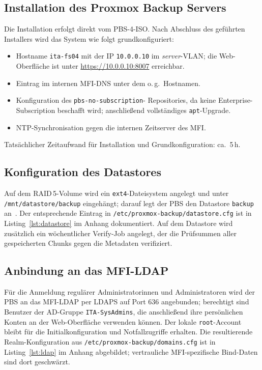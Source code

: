 \subsection{Installation des Proxmox Backup Servers}
\label{sec:InstallationPBS}
Die Installation erfolgt direkt vom \ac{PBS}-4-ISO. Nach Abschluss des
geführten Installers wird das System wie folgt grundkonfiguriert:
\begin{itemize}
    \item Hostname \texttt{ita-fs04} mit der IP \texttt{10.0.0.10}
          im \emph{server}-\ac{VLAN}; die Web-Oberfläche ist unter
          \url{https://10.0.0.10:8007} erreichbar.
    \item Eintrag im internen \ac{MFI}-DNS unter dem o.\,g.\
          Hostnamen.
    \item Konfiguration des \texttt{pbs-no-subscription}-
          Repositories, da keine Enterprise-Subscription beschafft
          wird; anschließend vollständiges \texttt{apt}-Upgrade.
    \item NTP-Synchronisation gegen die internen Zeitserver des
          \ac{MFI}.
\end{itemize}
Tatsächlicher Zeitaufwand für Installation und Grundkonfiguration:
ca.~5\,h.


\subsection{Konfiguration des Datastores}
\label{sec:Datastore}
Auf dem \ac{RAID}\,5-Volume wird ein \texttt{ext4}-Dateisystem
angelegt und unter \texttt{/mnt/datastore/backup} eingehängt;
darauf legt der \ac{PBS} den Datastore \texttt{backup}
an~\citep{PBSAdminGuide}. Der entsprechende Eintrag in
\texttt{/etc/proxmox-backup/datastore.cfg} ist in
Listing~\ref{lst:datastore} im Anhang dokumentiert.
Auf dem Datastore wird zusätzlich ein wöchentlicher Verify-Job
angelegt, der die Prüfsummen aller gespeicherten Chunks gegen die
Metadaten verifiziert.


\subsection{Anbindung an das MFI-LDAP}
\label{sec:LDAPAnbindung}
Für die Anmeldung regulärer Administratorinnen und Administratoren
wird der \ac{PBS} an das \ac{MFI}-\ac{LDAP} per LDAPS auf Port 636
angebunden; berechtigt sind Benutzer der \ac{AD}-Gruppe
\texttt{ITA-SysAdmins}, die anschließend ihre persönlichen Konten
an der Web-Oberfläche verwenden können.
Der lokale \texttt{root}-Account bleibt für die Initialkonfiguration
und Notfallzugriffe erhalten.
Die resultierende Realm-Konfiguration aus
\texttt{/etc/proxmox-backup/domains.cfg} ist in
Listing~\ref{lst:ldap} im Anhang abgebildet; vertrauliche
MFI-spezifische Bind-Daten sind dort geschwärzt.

